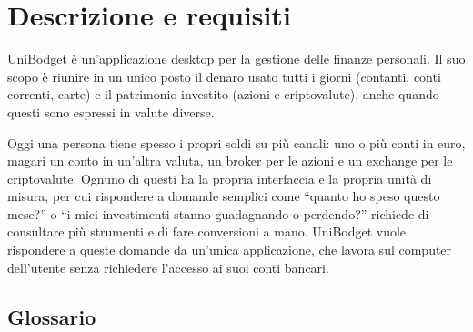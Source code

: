 \documentclass[11pt,a4paper,openright]{report}
\begin{document}
\section{Descrizione e requisiti}

UniBodget è un'applicazione desktop per la gestione delle finanze personali. Il suo scopo è riunire in
un unico posto il denaro usato tutti i giorni (contanti, conti correnti, carte) e il patrimonio investito
(azioni e criptovalute), anche quando questi sono espressi in valute diverse.

Oggi una persona tiene spesso i propri soldi su più canali: uno o più conti in euro, magari un conto in
un'altra valuta, un broker per le azioni e un exchange per le criptovalute. Ognuno di questi ha la propria
interfaccia e la propria unità di misura, per cui rispondere a domande semplici come ``quanto ho speso
questo mese?'' o ``i miei investimenti stanno guadagnando o perdendo?'' richiede di consultare più
strumenti e di fare conversioni a mano. UniBodget vuole rispondere a queste domande da un'unica
applicazione, che lavora sul computer dell'utente senza richiedere l'accesso ai suoi conti bancari.

\subsection*{Glossario}
\end{document}
